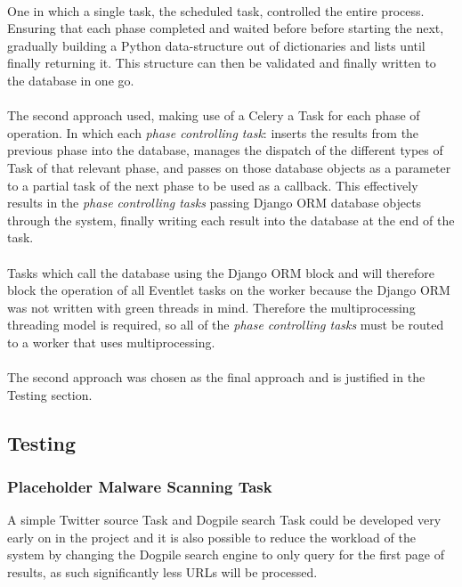 \paragraph{}
One in which a single task, the scheduled task, controlled the entire process.  Ensuring that each phase completed and waited before before starting the next, gradually building a Python data-structure out of dictionaries and lists until finally returning it.  This structure can then be validated and finally written to the database in one go.

\paragraph{}
The second approach used, making use of a Celery a Task for each phase of operation.  In which each \emph{phase controlling task}: inserts the results from the previous phase into the database, manages the dispatch of the different types of Task of that relevant phase, and passes on those database objects as a parameter to a partial task of the next phase to be used as a callback.  This effectively results in the \emph{phase controlling tasks} passing Django ORM database objects through the system, finally writing each result into the database at the end of the task.

\paragraph{}
Tasks which call the database using the Django ORM block and will therefore block the operation of all Eventlet tasks on the worker because the Django ORM was not written with green threads in mind.  Therefore the multiprocessing threading model is required, so all of the \emph{phase controlling tasks} must be routed to a worker that uses multiprocessing.

\paragraph{}
The second approach was chosen as the final approach and is justified in the Testing section.

\subsection{Testing}
\subsubsection{Placeholder Malware Scanning Task}
A simple Twitter source Task and Dogpile search Task could be developed very early on in the project and it is also possible to reduce the workload of the system by changing the Dogpile search engine to only query for the first page of results, as such significantly less URLs will be processed.

